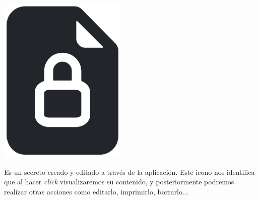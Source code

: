 \documentclass{\ClassPath/viu-tfm-template}
\begin{document}
{
    \begin{minipage}{0.1\linewidth}
        \includegraphics[width=\linewidth]{img/secret.png}
    \end{minipage}
    \hfill
    \begin{minipage}{0.85\linewidth}
        Es un secreto creado y editado a través de la aplicación. Este icono nos identifica que al hacer \textit{click} visualizaremos su contenido, y posteriormente podremos realizar otras acciones como editarlo, imprimirlo, borrarlo...
    \end{minipage}
}
\end{document}
